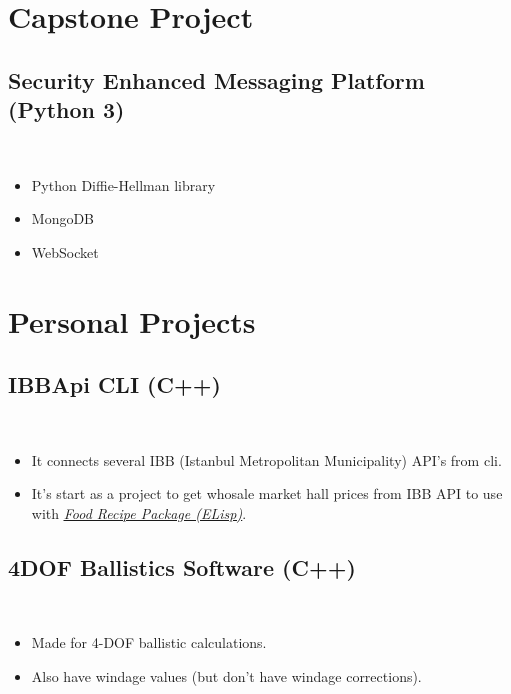 \documentclass[a4paper, 9pt]{extarticle}
\begin{document}
\maketitle{}
\myeducation{}
\myexperience{}

\section{Capstone Project}

\subsection{Security Enhanced Messaging Platform (Python 3)} \hfill \\
\begin{itemize}
	\item Python Diffie-Hellman library
	\item MongoDB
	\item WebSocket
\end{itemize}

\section{Personal Projects}

\subsection{IBBApi CLI (C++)} \hfill \\
\begin{itemize}
	\item It connects several IBB (Istanbul Metropolitan Municipality) API's from cli.
	\item It's start as a project to get whosale market hall prices from IBB API to use
		with \underline{\emph{\hyperref[lisp:frp]{Food Recipe Package (ELisp)}}}.
\end{itemize}

\subsection{4DOF Ballistics Software (C++)} \hfill \\
\begin{itemize}
	\item Made for 4-DOF ballistic calculations.
	\item Also have windage values (but don't have windage corrections).
\end{itemize}
\end{document}
